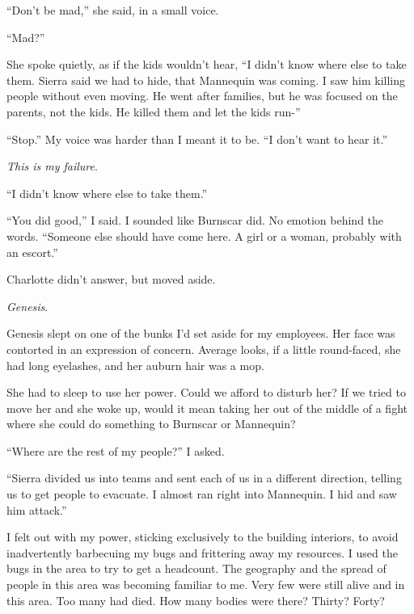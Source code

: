 ``Don't be mad,'' she said, in a small voice.



``Mad?''



She spoke quietly, as if the kids wouldn't hear, ``I didn't know where else to take them.  Sierra said we had to hide, that Mannequin was coming.  I saw him killing people without even moving.  He went after families, but he was focused on the parents, not the kids.  He killed them and let the kids run-''



``Stop.''  My voice was harder than I meant it to be.  ``I don't want to hear it.''



\emph{This is my failure}.



``I didn't know where else to take them.''



``You did good,'' I said.  I sounded like Burnscar did.  No emotion behind the words.  ``Someone else should have come here.  A girl or a woman, probably with an escort.''



Charlotte didn't answer, but moved aside.



\emph{Genesis}.



Genesis slept on one of the bunks I'd set aside for my employees.  Her face was contorted in an expression of concern.  Average looks, if a little round-faced, she had long eyelashes, and her auburn hair was a mop.



She had to sleep to use her power.  Could we afford to disturb her?  If we tried to move her and she woke up, would it mean taking her out of the middle of a fight where she could do something to Burnscar or Mannequin?



``Where are the rest of my people?'' I asked.



``Sierra divided us into teams and sent each of us in a different direction, telling us to get people to evacuate.  I almost ran right into Mannequin.  I hid and saw him attack.''



I felt out with my power, sticking exclusively to the building interiors, to avoid inadvertently barbecuing my bugs and frittering away my resources.  I used the bugs in the area to try to get a headcount.  The geography and the spread of people in this area was becoming familiar to me.  Very few were still alive and in this area.  Too many had died.  How many bodies were there?  Thirty?  Forty?



